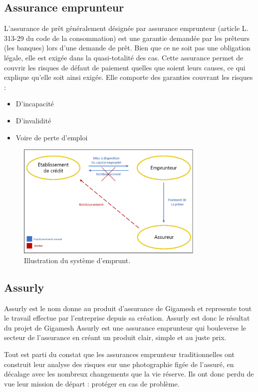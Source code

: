 \subsection{Assurance emprunteur}


L’assurance de prêt généralement désignée par assurance emprunteur (article L. 313-29 du code de la
consommation) est une garantie demandée par les prêteurs (les banques) lors d’une demande de prêt.
Bien que ce ne soit pas une obligation légale, elle est exigée dans la quasi-totalité des cas. Cette assurance permet de couvrir les risques de défaut de paiement quelles que soient leurs causes, ce qui explique qu’elle soit ainsi exigée. Elle comporte des garanties couvrant les risques :
\begin{itemize}
	\item D’incapacité
	\item D’invalidité
	\item Voire de perte d’emploi
\end{itemize}

\begin{figure}[!th]
\centering
\includegraphics[width=0.8\textwidth]{Figures/emprunteur}
\decoRule
\caption[Illustration du système d'emprunt]{Illustration du système d'emprunt.}
\label{fig:Emprunt}
\end{figure}

\subsection{Assurly}
Assurly est le nom donne au produit d’assurance de Gigamesh  et represente tout le travail effectue par
l’entreprise depuis sa création. Assurly est donc le résultat du projet de Gigamesh 
Assurly est une assurance emprunteur qui bouleverse le secteur de l’assurance en créant un produit clair,
simple et au juste prix.

Tout est parti du constat que les assurances emprunteur traditionnelles ont construit leur analyse des risques sur une photographie figée de l’assuré, en décalage avec les nombreux changements que la vie réserve. Ils ont donc perdu de vue leur mission de départ : protéger en cas de problème.

